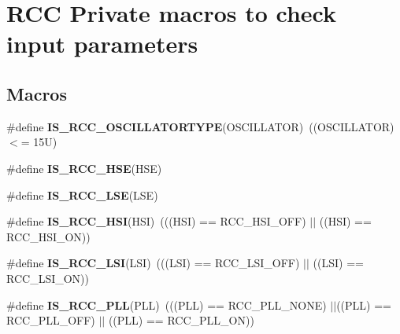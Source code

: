 \hypertarget{group___r_c_c___i_s___r_c_c___definitions}{}\section{R\+CC Private macros to check input parameters}
\label{group___r_c_c___i_s___r_c_c___definitions}
\subsection*{Macros}
\begin{DoxyCompactItemize}
\item 
\mbox{\label{group___r_c_c___i_s___r_c_c___definitions_ga3da0bb3923503cb8e84e5bd75912fbb8}} 
\#define {\bfseries I\+S\+\_\+\+R\+C\+C\+\_\+\+O\+S\+C\+I\+L\+L\+A\+T\+O\+R\+T\+Y\+PE}(O\+S\+C\+I\+L\+L\+A\+T\+OR)~((O\+S\+C\+I\+L\+L\+A\+T\+OR) $<$= 15\+U)
\item 
\#define {\bfseries I\+S\+\_\+\+R\+C\+C\+\_\+\+H\+SE}(H\+SE)
\item 
\#define {\bfseries I\+S\+\_\+\+R\+C\+C\+\_\+\+L\+SE}(L\+SE)
\item 
\mbox{\label{group___r_c_c___i_s___r_c_c___definitions_ga9d2bad5b4ad9ba8fb224ddbd949c27d6}} 
\#define {\bfseries I\+S\+\_\+\+R\+C\+C\+\_\+\+H\+SI}(H\+SI)~(((H\+SI) == R\+C\+C\+\_\+\+H\+S\+I\+\_\+\+O\+FF) $\vert$$\vert$ ((H\+SI) == R\+C\+C\+\_\+\+H\+S\+I\+\_\+\+ON))
\item 
\mbox{\label{group___r_c_c___i_s___r_c_c___definitions_gaaa7381dd9821c69346ce64453863b786}} 
\#define {\bfseries I\+S\+\_\+\+R\+C\+C\+\_\+\+L\+SI}(L\+SI)~(((L\+SI) == R\+C\+C\+\_\+\+L\+S\+I\+\_\+\+O\+FF) $\vert$$\vert$ ((L\+SI) == R\+C\+C\+\_\+\+L\+S\+I\+\_\+\+ON))
\item 
\mbox{\label{group___r_c_c___i_s___r_c_c___definitions_ga373b85039eb8036373fe80948c153ee0}} 
\#define {\bfseries I\+S\+\_\+\+R\+C\+C\+\_\+\+P\+LL}(P\+LL)~(((P\+LL) == R\+C\+C\+\_\+\+P\+L\+L\+\_\+\+N\+O\+NE) $\vert$$\vert$((P\+LL) == R\+C\+C\+\_\+\+P\+L\+L\+\_\+\+O\+FF) $\vert$$\vert$ ((P\+LL) == R\+C\+C\+\_\+\+P\+L\+L\+\_\+\+ON))
\item 

\end{DoxyCompactItemize}
